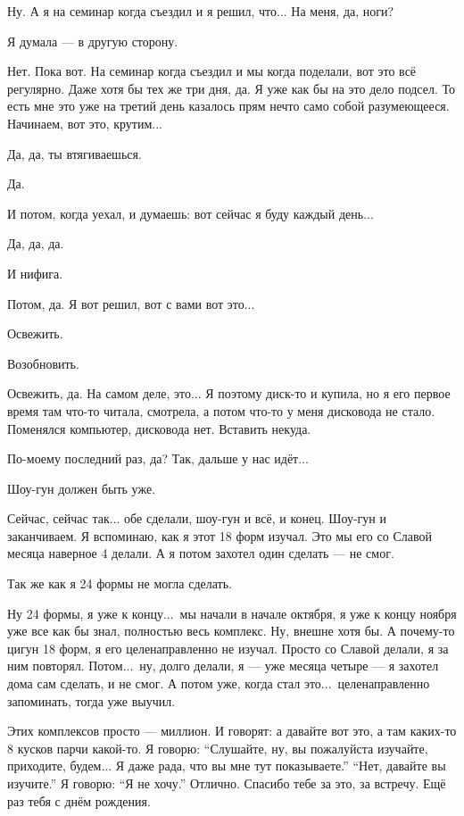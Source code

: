 \I
Ну. А я на семинар когда съездил и я решил, что... На меня, да, ноги?

\M
Я думала --- в другую сторону.

\I
Нет. Пока вот. На семинар когда съездил и мы когда поделали, вот это всё
регулярно. Даже хотя бы тех же три дня, да.
Я уже как бы на это дело подсел. То есть мне это уже на третий день казалось
прям нечто само собой разумеющееся. Начинаем, вот это, крутим...

\M
Да, да, ты втягиваешься.

\I
Да.

\M
И потом, когда уехал, и думаешь: вот сейчас я буду каждый день...

\I
Да, да, да.

\M
И нифига.

\I
Потом, да. Я вот решил, вот с вами вот это...

\M
Освежить.

\I
Возобновить.

\M
Освежить, да.
На самом деле, это... Я поэтому диск-то и
купила, но я его первое
время там что-то читала, смотрела, а потом что-то у меня дисковода не стало.
Поменялся компьютер, дисковода нет.
Вставить некуда.

\I
По-моему последний раз, да?
Так, дальше у нас идёт...

\M
Шоу-гун должен быть уже.

\I
Сейчас, сейчас так...
обе сделали, шоу-гун и всё, и конец.
Шоу-гун и заканчиваем.
Я вспоминаю, как я этот 18 форм изучал.
Это мы его со Славой месяца наверное 4 делали.
А я потом захотел один сделать ---
не смог.

\M
Так же как я 24 формы не
могла сделать.

\I
Ну 24 формы, я уже к концу...\ мы начали в начале октября, я уже к концу ноября
уже все как бы знал, полностью весь комплекс. Ну, внешне хотя бы.
А почему-то цигун 18 форм, я его целенаправленно
не изучал. Просто со Славой делали, я за ним
повторял. Потом...\ ну, долго делали, я --- уже месяца четыре --- я захотел дома сам сделать,
и не смог. А потом уже, когда стал это...\ целенаправленно
запоминать, тогда уже выучил.

\M
Этих комплексов просто --- миллион. И говорят:
а давайте вот это, а там каких-то 8 кусков парчи какой-то.
Я говорю: ``Слушайте, ну, вы пожалуйста изучайте, приходите, будем...
Я даже рада, что вы мне тут показываете.''
``Нет, давайте вы изучите.'' Я говорю: ``Я не хочу.''
Отлично.
Спасибо тебе за это, за встречу.
Ещё раз тебя с днём рождения.

